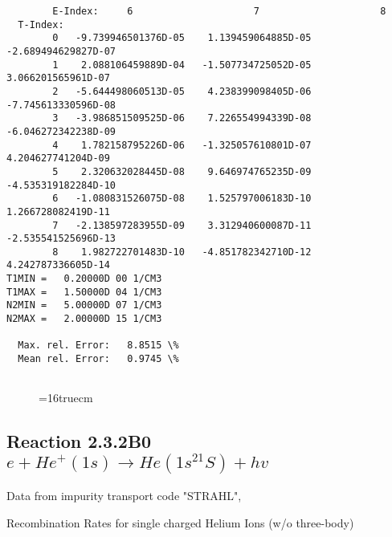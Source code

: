 \documentclass[12pt,dvipdfmx]{article}
\begin{document}
\begin{small}
\begin{verbatim}
        E-Index:     6                     7                     8
  T-Index:
        0   -9.739946501376D-05    1.139459064885D-05   -2.689494629827D-07
        1    2.088106459889D-04   -1.507734725052D-05    3.066201565961D-07
        2   -5.644498060513D-05    4.238399098405D-06   -7.745613330596D-08
        3   -3.986851509525D-06    7.226554994339D-08   -6.046272342238D-09
        4    1.782158795226D-06   -1.325057610801D-07    4.204627741204D-09
        5    2.320632028445D-08    9.646974765235D-09   -4.535319182284D-10
        6   -1.080831526075D-08    1.525797006183D-10    1.266728082419D-11
        7   -2.138597283955D-09    3.312940600087D-11   -2.535541525696D-13
        8    1.982722701483D-10   -4.851782342710D-12    4.242787336605D-14
T1MIN =   0.20000D 00 1/CM3
T1MAX =   1.50000D 04 1/CM3
N2MIN =   5.00000D 07 1/CM3
N2MAX =   2.00000D 15 1/CM3

  Max. rel. Error:   8.8515 \%
  Mean rel. Error:   0.9745 \%


\end{verbatim}\end{small}
\begin{figure} \label{2.8A0}
\epsfxsize=16truecm 
\end{figure}
\newpage

\subsection{
Reaction 2.3.2B0  $e + He^+(1s) \rightarrow He(1s^21S) + hv$
}
Data from impurity transport code "STRAHL", \cite{kn:Behringer}

  Recombination Rates for single charged Helium Ions (w/o three-body)
\end{document}

